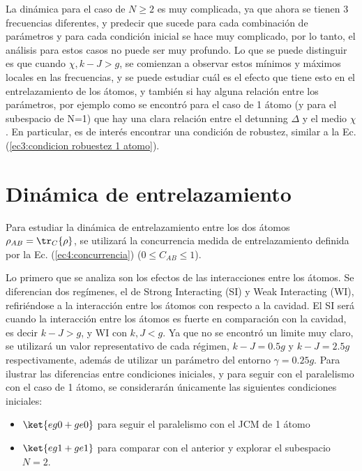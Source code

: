 La dinámica para el caso de $N\geq2$ es muy complicada, ya que ahora se tienen 3 frecuencias diferentes, y predecir que sucede para cada combinación de parámetros y para cada condición inicial se hace muy complicado, por lo tanto, el análisis para estos casos no puede ser muy profundo. Lo que se puede distinguir es que cuando $\chi,k-J>g$, se comienzan a observar estos mínimos y máximos locales en las frecuencias, y se puede estudiar cuál es el efecto que tiene esto en el entrelazamiento de los átomos, y también si hay alguna relación entre los parámetros, por ejemplo como se encontró para el caso de 1 átomo (y para el subespacio de N=1) que hay una clara relación entre el detunning $\Delta$ y el medio $\chi$. En particular, es de interés encontrar una condición de robustez, similar a la Ec. (\ref{ec3:condicion robuestez 1 atomo}).

\section{Dinámica de entrelazamiento}
Para estudiar la dinámica de entrelazamiento entre los dos átomos $\rho_{AB}=\tr_C\{\rho\}$, se utilizará la concurrencia medida de entrelazamiento definida por la Ec. (\ref{ec4:concurrencia}) ($0\leq C_{AB} \leq 1$).

Lo primero que se analiza son los efectos de las interacciones entre los átomos. Se diferencian dos regímenes, el de Strong Interacting (SI) y Weak Interacting (WI), refiriéndose a la interacción entre los átomos con respecto a la cavidad. El SI será cuando la interacción entre los átomos es fuerte en comparación con la cavidad, es decir $k-J>g$, y WI con $k,J<g$. Ya que no se encontró un limite muy claro, se utilizará un valor representativo de cada régimen, $k-J=0.5g$ y $k-J=2.5g$ respectivamente, además de utilizar un parámetro del entorno $\gamma=0.25g$. Para ilustrar las diferencias entre condiciones iniciales, y para seguir con el paralelismo con el caso de 1 átomo, se considerarán únicamente las siguientes condiciones iniciales:
\begin{itemize}
    \item $\ket{eg0+ge0}$ para seguir el paralelismo con el JCM de 1 átomo 
    \item $\ket{eg1+ge1}$ para comparar con el anterior y explorar el subespacio $N=2$.
\end{itemize}

